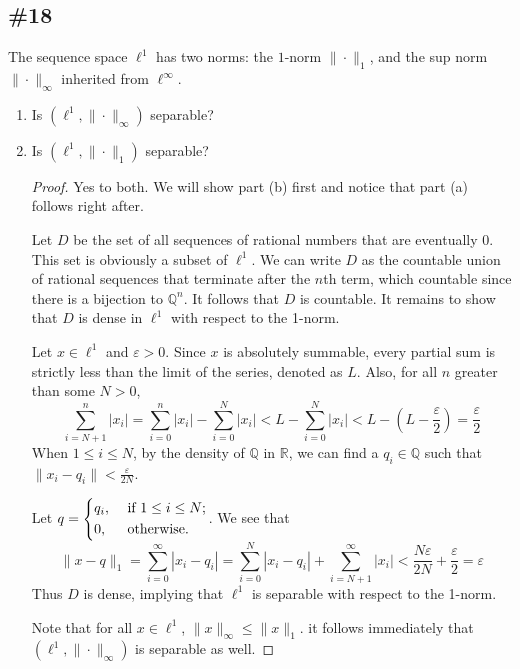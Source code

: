 \documentclass{article}
\theoremstyle{plain} %
\numberwithin{thm}{section} %
\theoremstyle{definition}
\begin{document}
        \subsection{\#18}

        The sequence space $\ell^1$ has two norms: the $1$-norm $\|\cdot\|_1$, and the sup norm $\|\cdot\|_\infty$ inherited from $\ell^\infty$.
        \begin{enumerate}[label=(\alph*)]
            \item Is $(\ell^1,\|\cdot\|_\infty)$ separable?
            \item Is $(\ell^1,\|\cdot\|_1)$ separable?
            \begin{proof}
                Yes to both. We will show part (b) first and notice that part (a) follows right after.

                Let \(D\) be the set of all sequences of rational numbers that are eventually 0. This set is obviously a subset of \(\ell ^1\). We can write \(D\) as the countable union of rational sequences that terminate after the \(n\)th term, which countable since there is a bijection to \(\mathbb{Q}^n\). It follows that \(D\) is countable. It remains to show that \(D\) is dense in \(\ell ^1\) with respect to the 1-norm.

                Let \(x \in \ell ^1\) and \(\varepsilon > 0\). Since \(x\) is absolutely summable, every partial sum is strictly less than the limit of the series, denoted as \(L\). Also, for all \(n\) greater than some \(N > 0\),
                \[
                    \sum_{i=N+1} ^{n} |x_i| = \sum_{i=0} ^{n} |x_i| - \sum_{i=0} ^{N} |x_i| < L - \sum_{i=0} ^{N} |x_i| < L - \left(L - \frac{\varepsilon}{2}\right) = \frac{\varepsilon}{2}
                \]
                When \(1\leq i\leq N\), by the density of \(\mathbb{Q}\) in \(\mathbb{R}\), we can find a \(q_i \in \mathbb{Q}\) such that \(\|x_i - q_i\| < \frac{\varepsilon}{2N}\).
                
                Let \(q = \begin{dcases}
                    q_i, &\text{ if } 1\leq i\leq N ;\\
                    0, &\text{ otherwise} .
                \end{dcases}\). 
                We see that
                \[
                    \|x-q\| _1 = \sum_{i=0} ^{\infty} |x_i - q_i| = \sum_{i=0} ^N |x_i - q_i| + \sum_{i=N+1}^{\infty} |x_i| < \frac{N\varepsilon}{2N} + \frac{\varepsilon}{2} = \varepsilon
                \]
                Thus \(D\) is dense, implying that \(\ell ^1\) is separable with respect to the 1-norm.

                Note that for all \(x \in \ell ^1\), \(\|x\| _\infty \leq \|x\| _1\). it follows immediately that \((\ell ^1, \|\cdot\| _\infty)\) is separable as well.

            \end{proof}
        \end{enumerate}
        
\end{document}
